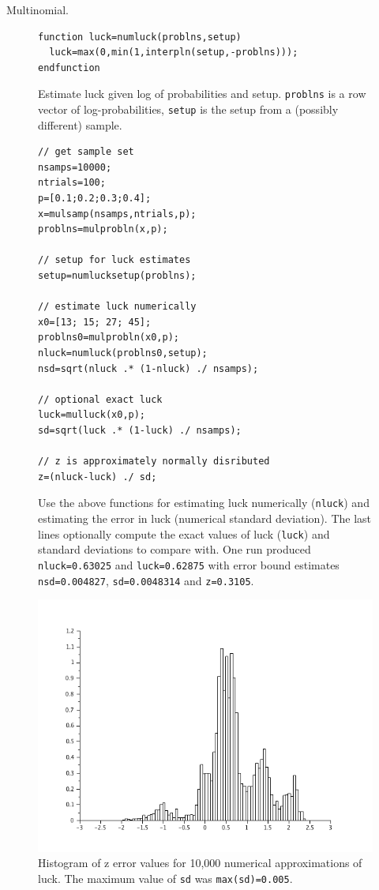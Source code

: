\begin{example}{Multinomial.}
\begin{figure}
\caption{\label{fig:numluck}Estimate luck given log of probabilities and setup.  {\tt problns} is a row vector of log-probabilities, {\tt setup} is the setup from a (possibly different) sample.}
\lstset{language=Scilab}
\begin{lstlisting}
function luck=numluck(problns,setup)
  luck=max(0,min(1,interpln(setup,-problns)));
endfunction
\end{lstlisting}
\end{figure}

\begin{figure}
\caption{\label{fig:numluckprog}Use the above functions for estimating luck numerically ({\tt nluck}) and estimating the error in luck (numerical standard deviation).  The last lines optionally compute the exact values of luck ({\tt luck}) and standard deviations to compare with.  One run produced {\tt nluck=0.63025} and {\tt luck=0.62875} with error bound estimates {\tt nsd=0.004827}, {\tt sd=0.0048314} and {\tt z=0.3105}.}
\lstset{language=Scilab}
\begin{lstlisting}
// get sample set
nsamps=10000;
ntrials=100;
p=[0.1;0.2;0.3;0.4];
x=mulsamp(nsamps,ntrials,p);
problns=mulprobln(x,p);

// setup for luck estimates
setup=numlucksetup(problns);

// estimate luck numerically
x0=[13; 15; 27; 45];
problns0=mulprobln(x0,p);
nluck=numluck(problns0,setup);
nsd=sqrt(nluck .* (1-nluck) ./ nsamps);

// optional exact luck
luck=mulluck(x0,p);
sd=sqrt(luck .* (1-luck) ./ nsamps);

// z is approximately normally disributed
z=(nluck-luck) ./ sd;
\end{lstlisting}
\end{figure}

\begin{figure}
  \caption{Histogram of z error values for 10,000 numerical approximations of luck.  The maximum value of {\tt sd} was {\tt max(sd)=0.005}.}
  \centering
    \includegraphics[width=1.00\textwidth]{img/compz.png}
\end{figure}

\end{example}
